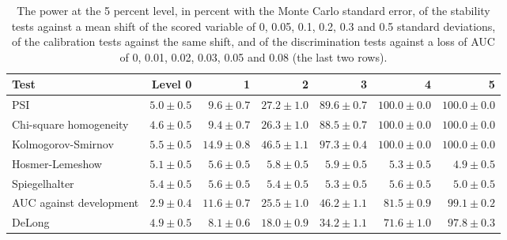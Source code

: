 \begin{table}[htbp]
\centering
\setlength{\tabcolsep}{3pt}
\footnotesize
\caption{The power at the 5 percent level, in percent with the Monte Carlo standard error, of the stability tests against a mean shift of the scored variable of 0, 0.05, 0.1, 0.2, 0.3 and 0.5 standard deviations, of the calibration tests against the same shift, and of the discrimination tests against a loss of AUC of 0, 0.01, 0.02, 0.03, 0.05 and 0.08 (the last two rows).}
\label{tab:vt-drift}
\begin{tabular}{lrrrrrr}
\toprule
Test & Level 0 & 1 & 2 & 3 & 4 & 5 \\
\midrule
PSI & $5.0\pm0.5$ & $9.6\pm0.7$ & $27.2\pm1.0$ & $89.6\pm0.7$ & $100.0\pm0.0$ & $100.0\pm0.0$ \\
Chi-square homogeneity & $4.6\pm0.5$ & $9.4\pm0.7$ & $26.3\pm1.0$ & $88.5\pm0.7$ & $100.0\pm0.0$ & $100.0\pm0.0$ \\
Kolmogorov-Smirnov & $5.5\pm0.5$ & $14.9\pm0.8$ & $46.5\pm1.1$ & $97.3\pm0.4$ & $100.0\pm0.0$ & $100.0\pm0.0$ \\
Hosmer-Lemeshow & $5.1\pm0.5$ & $5.6\pm0.5$ & $5.8\pm0.5$ & $5.9\pm0.5$ & $5.3\pm0.5$ & $4.9\pm0.5$ \\
Spiegelhalter & $5.4\pm0.5$ & $5.6\pm0.5$ & $5.4\pm0.5$ & $5.3\pm0.5$ & $5.6\pm0.5$ & $5.0\pm0.5$ \\
AUC against development & $2.9\pm0.4$ & $11.6\pm0.7$ & $25.5\pm1.0$ & $46.2\pm1.1$ & $81.5\pm0.9$ & $99.1\pm0.2$ \\
DeLong & $4.9\pm0.5$ & $8.1\pm0.6$ & $18.0\pm0.9$ & $34.2\pm1.1$ & $71.6\pm1.0$ & $97.8\pm0.3$ \\
\bottomrule
\end{tabular}
\end{table}
